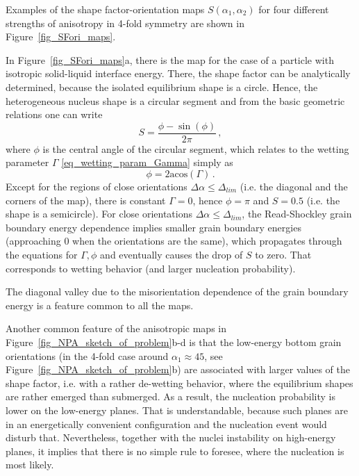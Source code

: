 Examples of the shape factor-orientation maps $S(\alpha_1,\alpha_2)$ for four different strengths of anisotropy in 4-fold symmetry are shown in Figure~\ref{fig_SFori_maps}.

In Figure~\ref{fig_SFori_maps}a, there is the map for the case of a particle with isotropic solid-liquid interface energy. There, the shape factor can be analytically determined, because the isolated equilibrium shape is a circle. Hence, the heterogeneous nucleus shape is a circular segment and from the basic geometric relations one can write
\begin{equation}
	S = \frac{\phi-\sin(\phi)}{2\pi} \,,
\end{equation}
where $\phi$ is the central angle of the circular segment, which relates to the wetting parameter $\Gamma$ \eqref{eq_wetting_param_Gamma} simply as
\begin{equation}
	\phi = 2\mathrm{acos}(\Gamma) \,.
\end{equation}
Except for the regions of close orientations $\Delta\alpha\leq \Delta_{lim}$ (i.e. the diagonal and the corners of the map), there is constant $\Gamma=0$, hence $\phi = \pi$ and $S = 0.5$ (i.e. the shape is a semicircle). For close orientations $\Delta\alpha\leq \Delta_{lim}$, the Read-Shockley grain boundary energy dependence implies smaller grain boundary energies (approaching 0 when the orientations are the same), which propagates through the equations for $\Gamma,\phi$ and eventually causes the drop of $S$ to zero. That corresponds to wetting behavior (and larger nucleation probability).

The diagonal valley due to the misorientation dependence of the grain boundary energy is a feature common to all the maps. 

Another common feature of the anisotropic maps in Figure~\ref{fig_NPA_sketch_of_problem}b-d is that the low-energy bottom grain orientations (in the 4-fold case around $\alpha_1\approx 45$\textdegree, see Figure~\ref{fig_NPA_sketch_of_problem}b) are associated with larger values of the shape factor, i.e. with a rather de-wetting behavior, where the equilibrium shapes are rather emerged than submerged. As a result, the nucleation probability is lower on the low-energy planes. That is understandable, because such planes are in an energetically convenient configuration and the nucleation event would disturb that. Nevertheless, together with the nuclei instability on high-energy planes, it implies that there is no simple rule to foresee, where the nucleation is most likely.

